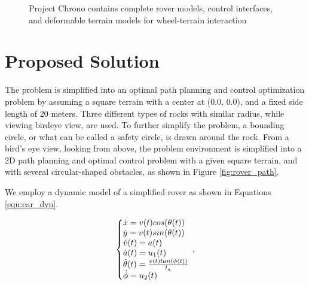 \documentclass{article}
\begin{document}
\begin{figure}
	\centering     %
	\caption{Project Chrono contains complete rover models, control interfaces, and deformable terrain models for wheel-terrain interaction}
\end{figure}


\section{Proposed Solution}

The problem is simplified into an optimal path planning and control optimization problem by assuming a square terrain with a center at (0.0, 0.0), and a fixed side length of 20 meters. Three different types of rocks with similar radius, while viewing birdeye view, are used. To further simplify the problem, a bounding circle, or what can be called a safety circle, is drawn around the rock. From a bird's eye view, looking from above, the problem environment is simplified into a 2D path planning and optimal control problem with a given square terrain, and with several circular-shaped obstacles, as shown in Figure \ref{fig:rover_path}.

We employ a dynamic model of a simplified rover as shown in Equations \ref{equ:car_dyn}.

\begin{equation}
\label{equ:car_dyn}
  \left\{\begin{array}{@{}l@{}}
    \dot{x}=v(t)cos(\theta(t))  \\
    \dot{y}=v(t)sin(\theta(t))  \\
    \dot{v}(t) = a(t) \\
    \dot{a}(t) = u_{1}(t) \\
    \dot{\theta}(t) = \frac{v(t)tan(\phi(t))}{l_{a}} \\
    \dot{\phi}=u_{2}(t) \\
  \end{array}\right.\,.
\end{equation}
\end{document}
